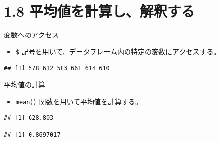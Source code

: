 \documentclass[
  ignorenonframetext,
]{beamer}
\newenvironment{Shaded}{\begin{snugshade}}{\end{snugshade}}
\newcommand{\CommentTok}[1]{\textcolor[rgb]{0.56,0.35,0.01}{\textit{#1}}}
\newcommand{\FunctionTok}[1]{\textcolor[rgb]{0.00,0.00,0.00}{#1}}
\newcommand{\NormalTok}[1]{#1}
\newcommand{\SpecialCharTok}[1]{\textcolor[rgb]{0.00,0.00,0.00}{#1}}
\providecommand{\tightlist}{%
  \setlength{\itemsep}{0pt}\setlength{\parskip}{0pt}}
\begin{document}
\hypertarget{ux5e73ux5747ux5024ux3092ux8a08ux7b97ux3057ux89e3ux91c8ux3059ux308b}{%
\section{1.8
平均値を計算し、解釈する}\label{ux5e73ux5747ux5024ux3092ux8a08ux7b97ux3057ux89e3ux91c8ux3059ux308b}}

\begin{frame}[fragile]{変数へのアクセス}
\protect\hypertarget{ux5909ux6570ux3078ux306eux30a2ux30afux30bbux30b9}{}
\begin{itemize}
\tightlist
\item
  \texttt{\$} 記号を用いて、データフレーム内の特定の変数にアクセスする。
\end{itemize}

\begin{Shaded}
\end{Shaded}

\begin{verbatim}
## [1] 578 612 583 661 614 610
\end{verbatim}
\end{frame}

\begin{frame}[fragile]{平均値の計算}
\protect\hypertarget{ux5e73ux5747ux5024ux306eux8a08ux7b97}{}
\begin{itemize}
\tightlist
\item
  \texttt{mean()} 関数を用いて平均値を計算する。
\end{itemize}

\begin{Shaded}
\end{Shaded}

\begin{verbatim}
## [1] 628.803
\end{verbatim}

\begin{Shaded}
\end{Shaded}

\begin{verbatim}
## [1] 0.8697017
\end{verbatim}
\end{frame}
\end{document}
